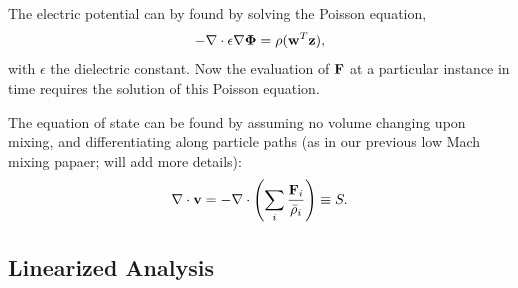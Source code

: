 \documentclass[final]{siamltex}
\def\Fb {{\bf F}}
\def\vb {{\bf v}}
\def\wb {{\bf w}}
\def\zb {{\bf z}}
\def\Phib   {\boldsymbol{\Phi}}
\begin{document}
The electric potential can by found by solving the Poisson equation,
\begin{equation}
-\nabla\cdot\epsilon\nabla\Phib = \rho(\wb^T\zb),
\end{equation}
with $\epsilon$ the dielectric constant.  Now the evaluation of $\Fb$
at a particular instance in time requires the solution of this Poisson equation.

The equation of state can be found by assuming no volume changing upon mixing,
and differentiating along particle paths (as in our previous low Mach mixing
papaer; will add more details):
\begin{equation}
\nabla\cdot\vb = -\nabla\cdot\left(\sum_i\frac{\Fb_i}{\bar\rho_i}\right) \equiv S\label{eq:S}.
\end{equation}

\subsection{Linearized Analysis}

\clearpage
\end{document}
